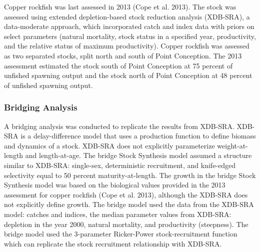 \documentclass[11pt,
  english,
  a4paper,
]{article}
\begin{document}
\leavevmode\tagmcend\tagstructend


Copper rockfish was last assessed in 2013 {(Cope et al. 2013)\leavevmode\tagmcend\tagstructend}. The stock was assessed using extended depletion-based stock reduction analysis (XDB-SRA), a data-moderate approach, which incorporated catch and index data with priors on select parameters (natural mortality, stock status in a specified year, productivity, and the relative status of maximum productivity). Copper rockfish was assessed as two separated stocks, split north and south of Point Conception. The 2013 assessment estimated the stock south of Point Conception at 75 percent of unfished spawning output and the stock north of Point Conception at 48 percent of unfished spawning output.

\leavevmode\tagmcend\tagstructend\par


\hypertarget{bridging-analysis}{%
\subsubsection{Bridging Analysis}\label{bridging-analysis}}

\leavevmode\tagmcend\tagstructend


A bridging analysis was conducted to replicate the results from XDB-SRA. XDB-SRA is a delay-difference model that uses a production function to define biomass and dynamics of a stock. XDB-SRA does not explicitly parameterize weight-at-length and length-at-age. The bridge Stock Synthesis model assumed a structure similar to XDB-SRA: single-sex, deterministic recruitment, and knife-edged selectivity equal to 50 percent maturity-at-length. The growth in the bridge Stock Synthesis model was based on the biological values provided in the 2013 assessment for copper rockfish {(Cope et al. 2013)\leavevmode\tagmcend\tagstructend}, although the XDB-SRA does not explicitly define growth. The bridge model used the data from the XDB-SRA model: catches and indices, the median parameter values from XDB-SRA: depletion in the year 2000, natural mortality, and productivity (steepness). The bridge model used the 3-parameter Ricker-Power stock-recruitment function which can replicate the stock recruitment relationship with XDB-SRA.
\end{document}
